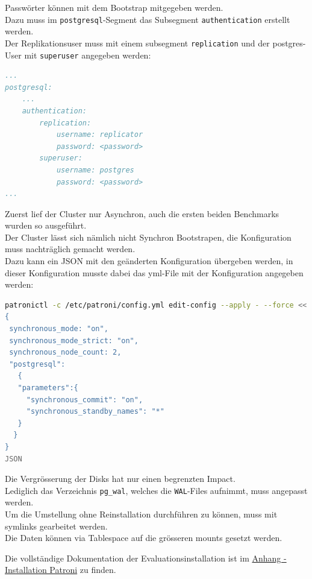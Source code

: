 \begin{flushleft}
    Passwörter können mit dem Bootstrap mitgegeben werden.\\
    Dazu muss im \texttt{postgresql}-Segment das Subsegment \texttt{authentication} erstellt werden.\\
    Der Replikationsuser muss mit einem subsegment \texttt{replication} und der postgres-User mit \texttt{superuser} angegeben werden:
\lstset{style=gra_codestyle}
\begin{lstlisting}[language=yaml, caption=Patroni - Passwörter,captionpos=b,label={lst:patroni_passwords},breaklines=true]
...
postgresql:
    ...
    authentication:
        replication:
            username: replicator
            password: <password>
        superuser:
            username: postgres
            password: <password>
...
\end{lstlisting}
\end{flushleft}
\begin{flushleft}
    Zuerst lief der Cluster nur Asynchron, auch die ersten beiden Benchmarks wurden so ausgeführt.\\
    Der Cluster lässt sich nämlich nicht Synchron Bootstrapen, die Konfiguration muss nachträglich gemacht werden.\\
    Dazu kann ein JSON mit den geänderten Konfiguration übergeben werden, in dieser Konfiguration musste dabei das yml-File mit der Konfiguration angegeben werden:
\lstset{style=gra_codestyle}
\begin{lstlisting}[language=bash, caption=Patroni - Synchrone Replikation setzen,captionpos=b,label={lst:patroni_set_sync_replication},breaklines=true]
patronictl -c /etc/patroni/config.yml edit-config --apply - --force <<'JSON'
{
 synchronous_mode: "on",
 synchronous_mode_strict: "on",
 synchronous_node_count: 2,
 "postgresql":
   {
   "parameters":{
     "synchronous_commit": "on",
     "synchronous_standby_names": "*"
   }
  }
}
JSON
\end{lstlisting}
\end{flushleft}
\begin{flushleft}
    Die Vergrösserung der Disks hat nur einen begrenzten Impact.\\
    Lediglich das Verzeichnis \texttt{pg\_wal}, welches die \texttt{WAL}-Files aufnimmt, muss angepasst werden.\\
    Um die Umstellung ohne Reinstallation durchführen zu können, muss mit symlinks gearbeitet werden.\\
    Die Daten können via Tablespace auf die grösseren mounts gesetzt werden.\\
\end{flushleft}
\begin{flushleft}
    Die vollständige Dokumentation der Evaluationsinstallation ist im \hyperref[subsec:evaluation_installation_patroni]{Anhang - Installation Patroni} zu finden.
\end{flushleft}